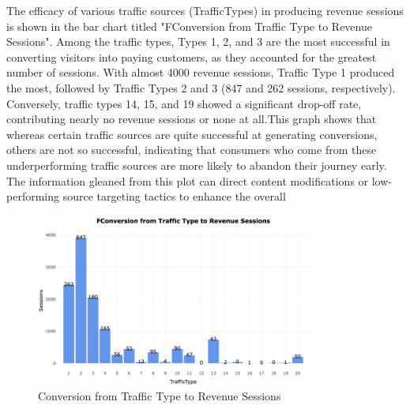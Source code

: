 \documentclass[12pt]{article}
\begin{document}
\FloatBarrier
The efficacy of various traffic sources (TrafficTypes) in producing revenue sessions is shown in the bar chart titled "FConversion from Traffic Type to Revenue Sessions". Among the traffic types, Types 1, 2, and 3 are the most successful in converting visitors into paying customers, as they accounted for the greatest number of sessions. With almost 4000 revenue sessions, Traffic Type 1 produced the most, followed by Traffic Types 2 and 3 (847 and 262 sessions, respectively). Conversely, traffic types 14, 15, and 19 showed a significant drop-off rate, contributing nearly no revenue sessions or none at all.This graph shows that whereas certain traffic sources are quite successful at generating conversions, others are not so successful, indicating that consumers who come from these underperforming traffic sources are more likely to abandon their journey early. The information gleaned from this plot can direct content modifications or low-performing source targeting tactics to enhance the overall
\begin{figure}[h]
    \centering
   \includegraphics[width=0.82\textwidth]{FCOn.png}  
    \caption{Conversion from Traffic Type to Revenue Sessions}
\end{figure}
\vspace{0.5cm}
\end{document}
